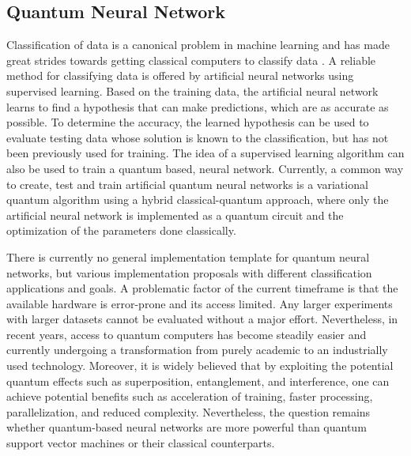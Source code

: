 \subsection{Quantum Neural Network}
Classification of data is a canonical problem in machine learning and has made great strides towards getting classical computers to classify data \cite{Killoran_2019,ClassificationWithQNN}. A reliable method for classifying data is offered by artificial neural networks using supervised learning. Based on the training data, the artificial neural network learns to find a hypothesis that can make predictions, which are as accurate as possible. To determine the accuracy, the learned hypothesis can be used to evaluate testing data whose solution is known to the classification, but has not been previously used for training. The idea of a supervised learning algorithm can also be used to train a quantum based, neural network. Currently, a common way to create, test and train artificial quantum neural networks is a variational quantum algorithm using a hybrid classical-quantum approach, where only the artificial neural network is implemented as a quantum circuit and the optimization of the parameters done classically\cite{Cerezo_2021,mccleanBarrenPlateausQuantum2018,Zhao_2021,schuld_SQMLmodelsAreKernelMethods,sim_expressibility_2019,Abbas_2021}. \par
There is currently no general implementation template for quantum neural networks, but various implementation proposals with different classification applications and goals. A problematic factor of the current timeframe is that the available hardware is error-prone and its access limited. Any larger experiments with larger datasets cannot be evaluated without a major effort. Nevertheless, in recent years, access to quantum computers has become steadily easier and currently undergoing a transformation from purely academic to an industrially used technology\cite{schuldCircuitcentricQuantumClassifiers2020}. Moreover, it is widely believed that by exploiting the potential quantum effects such as superposition, entanglement, and interference, one can achieve potential benefits such as acceleration of training, faster processing, parallelization, and reduced complexity. Nevertheless, the question remains whether quantum-based neural networks are more powerful than quantum support vector machines or their classical counterparts.

